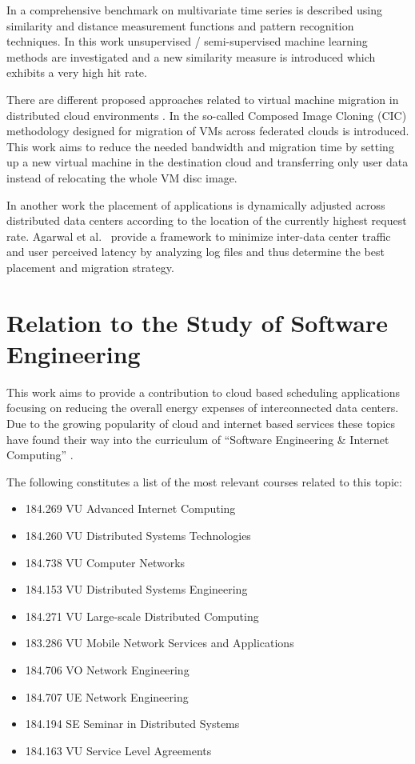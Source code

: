 \documentclass[a4paper]{article}
\begin{document}
In \cite{lin2011pattern} a comprehensive benchmark on multivariate time series is described using similarity and distance measurement functions and pattern recognition techniques. In this work unsupervised / semi-supervised machine learning methods are investigated and a new similarity measure is introduced which exhibits a very high hit rate. 

There are different proposed approaches related to virtual machine migration in distributed cloud environments \cite{celesti2010improving, malet2010resource}. In \cite{celesti2010improving} the so-called Composed Image Cloning (CIC) methodology designed for migration of VMs across federated clouds is introduced. This work aims to reduce the needed bandwidth and migration time by setting up a new virtual machine in the destination cloud and transferring only user data instead of relocating the whole VM disc image. 

In another work \cite{malet2010resource} the placement of applications is dynamically adjusted across distributed data centers according to the location of the currently highest request rate. Agarwal et al.\ \cite{agarwal2010volley} provide a framework to minimize inter-data center traffic and user perceived latency by analyzing log files and thus determine the best placement and migration strategy. 


\section{Relation to the Study of Software Engineering}

This work aims to provide a contribution to cloud based scheduling applications focusing on reducing the overall energy expenses of interconnected data centers. Due to the growing popularity of cloud and internet based services these topics have found their way into the curriculum of ``Software Engineering \& Internet Computing'' \cite{curriculum2013curriculum}. 

The following constitutes a list of the most relevant courses related to this topic:


\begin{itemize}

\item{184.269 VU Advanced Internet Computing}
\item{184.260 VU Distributed Systems Technologies}
\item{184.738 VU Computer Networks}
\item{184.153 VU Distributed Systems Engineering}
\item{184.271 VU Large-scale Distributed Computing}
\item{183.286 VU Mobile Network Services and Applications}
\item{184.706 VO Network Engineering}
\item{184.707 UE Network Engineering}
\item{184.194 SE Seminar in Distributed Systems}
\item{184.163 VU Service Level Agreements }

\end{itemize}

\printbibliography
\end{document}
